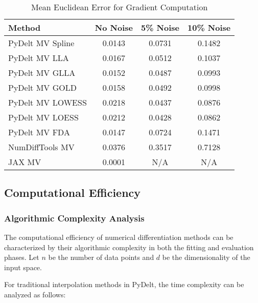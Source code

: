\documentclass[10pt,journal,compsoc]{IEEEtran}
\begin{document}
\begin{table}[!t]
\caption{Mean Euclidean Error for Gradient Computation}
\label{tab:gradient}
\centering
\begin{tabular}{lccc}
\toprule
\textbf{Method} & \textbf{No Noise} & \textbf{5\% Noise} & \textbf{10\% Noise} \\
\midrule
PyDelt MV Spline & 0.0143 & 0.0731 & 0.1482 \\
PyDelt MV LLA & 0.0167 & 0.0512 & 0.1037 \\
PyDelt MV GLLA & 0.0152 & 0.0487 & 0.0993 \\
PyDelt MV GOLD & 0.0158 & 0.0492 & 0.0998 \\
PyDelt MV LOWESS & 0.0218 & 0.0437 & 0.0876 \\
PyDelt MV LOESS & 0.0212 & 0.0428 & 0.0862 \\
PyDelt MV FDA & 0.0147 & 0.0724 & 0.1471 \\
NumDiffTools MV & 0.0376 & 0.3517 & 0.7128 \\
JAX MV & 0.0001 & N/A & N/A \\
\bottomrule
\end{tabular}
\end{table}

\subsection{Computational Efficiency}

\subsubsection{Algorithmic Complexity Analysis}

The computational efficiency of numerical differentiation methods can be characterized by their algorithmic complexity in both the fitting and evaluation phases. Let $n$ be the number of data points and $d$ be the dimensionality of the input space.

For traditional interpolation methods in PyDelt, the time complexity can be analyzed as follows:
\end{document}

